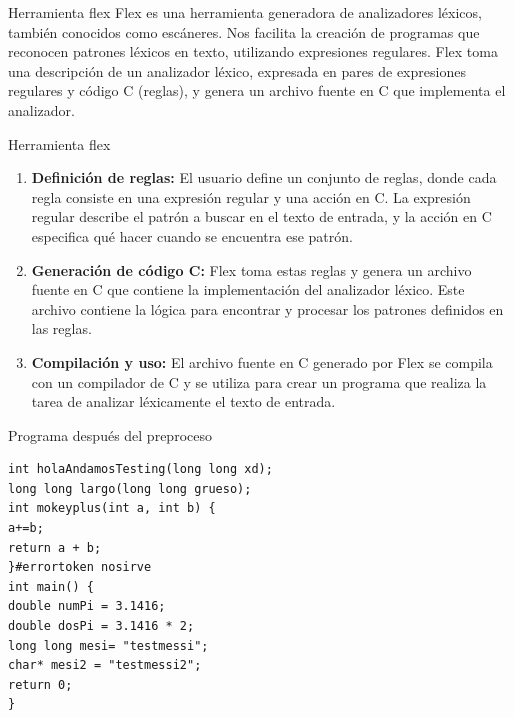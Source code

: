 \documentclass{beamer}
\begin{document}
\begin{frame}{Herramienta flex}
Flex es una herramienta generadora de analizadores léxicos, también conocidos como escáneres. Nos facilita la creación de programas que reconocen patrones léxicos en texto, utilizando expresiones regulares. Flex toma una descripción de un analizador léxico, expresada en pares de expresiones regulares y código C (reglas), y genera un archivo fuente en C que implementa el analizador.
\end{frame}

\begin{frame}{Herramienta flex}
\begin{enumerate}
 \item<1-> \textbf{Definición de reglas:} El usuario define un conjunto de reglas, donde cada regla consiste en una expresión regular y una acción en C. La expresión regular describe el patrón a buscar en el texto de entrada, y la acción en C especifica qué hacer cuando se encuentra ese patrón.
 \item<2-> \textbf{Generación de código C:} Flex toma estas reglas y genera un archivo fuente en C que contiene la implementación del analizador léxico. Este archivo contiene la lógica para encontrar y procesar los patrones definidos en las reglas.
 \item<3> \textbf{Compilación y uso:} El archivo fuente en C generado por Flex se compila con un compilador de C y se utiliza para crear un programa que realiza la tarea de analizar léxicamente el texto de entrada.
\end{enumerate}
\end{frame}

\begin{frame}[fragile]{Programa después del preproceso}{}

  \begin{lstlisting}[style=mycstyle]
int holaAndamosTesting(long long xd);
long long largo(long long grueso);
int mokeyplus(int a, int b) {
a+=b;
return a + b; 
}#errortoken nosirve
int main() {
double numPi = 3.1416;
double dosPi = 3.1416 * 2;
long long mesi= "testmessi"; 
char* mesi2 = "testmessi2"; 
return 0;
}  \end{lstlisting}
\end{frame}
\end{document}
